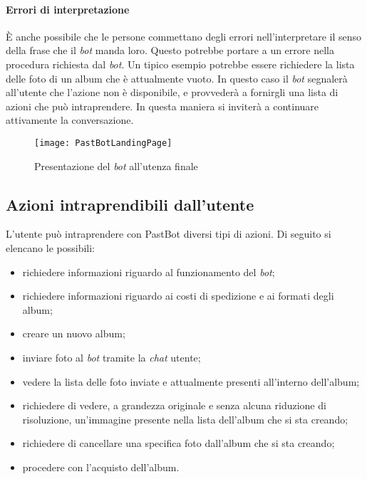 \paragraph*{Errori di interpretazione} È anche possibile che le persone
commettano degli errori nell'interpretare il senso della frase che il
\textit{bot} manda loro. Questo potrebbe portare a un errore nella procedura
richiesta dal \textit{bot}. Un tipico esempio potrebbe essere richiedere la
lista delle foto di un album che è attualmente vuoto. In questo caso il
\textit{bot} segnalerà all'utente che l'azione non è disponibile, e provvederà
a fornirgli una lista di azioni che può intraprendere. In questa maniera si
inviterà a continuare attivamente la conversazione.

\begin{figure}[H]
  \centering
  \texttt{[image: PastBotLandingPage]}
  \caption{Presentazione del \textit{bot} all'utenza finale}
\end{figure}

\subsection{Azioni intraprendibili dall'utente}

L'utente può intraprendere con PastBot diversi tipi di azioni. Di seguito si
elencano le possibili:

\begin{itemize}

  \item richiedere informazioni riguardo al funzionamento del \textit{bot};
  \item richiedere informazioni riguardo ai costi di spedizione e ai formati
degli album;
  \item creare un nuovo album;
  \item inviare foto al \textit{bot} tramite la \textit{chat} utente;
  \item vedere la lista delle foto inviate e attualmente presenti all'interno
dell'album;
  \item richiedere di vedere, a grandezza originale e senza alcuna riduzione di
risoluzione, un'immagine presente nella lista dell'album che si sta creando;
  \item richiedere di cancellare una specifica foto dall'album che si sta
creando;
  \item procedere con l'acquisto dell'album.
\end{itemize}

